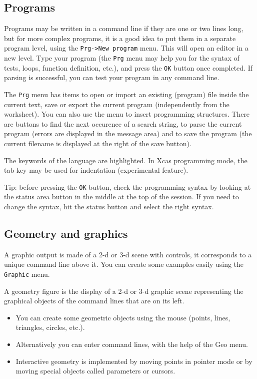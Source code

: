 \documentclass{article}
\begin{document}
\subsection{Programs}
Programs may be written in a command line if they are one or two
lines long, but for more complex programs, it is a good idea to
put them in a separate program level, using the
\verb|Prg->New program| menu. This will open an editor in
a new level. Type your program (the {\tt Prg} menu may help you
for the syntax of tests, loops, function definition, etc.), 
and press the {\tt OK} button once completed. 
If parsing is successful, you can test your program
in any command line.

The \verb|Prg| menu has items to open or
import an existing (program) file inside the current text, save
or export the current program (independently from the worksheet). 
You can also use the menu 
to insert programming structures. There are buttons to find the
next occurence of a search string, to parse the current program
(errors are displayed in the message area) and to save the
program (the current filename is displayed at the right of the
save button).

The keywords of the language are highlighted. In Xcas programming
mode, the tab key may be used for indentation (experimental
feature).

Tip: before pressing the {\tt OK} button, check the programming
syntax by looking at the status area button
in the middle at the top of the session. If you need
to change the syntax, hit the status button and select the right syntax.

\subsection{Geometry and graphics}
A graphic output is made of a 2-d or 3-d scene with controls,
it corresponds to a unique command line above it. 
You can create some examples easily using the {\tt Graphic} menu.

A geometry figure is the display of a 2-d or 3-d graphic scene 
representing the graphical objects of the command lines 
that are on its left.
\begin{itemize}
\item You can create some geometric objects using the mouse (points,
lines, triangles, circles, etc.).
\item Alternatively you can enter command lines, with the help
of the Geo menu.
\item
Interactive geometry is implemented by moving points in pointer
mode or by moving special objects called parameters or cursors. 
\end{itemize}
\end{document}
